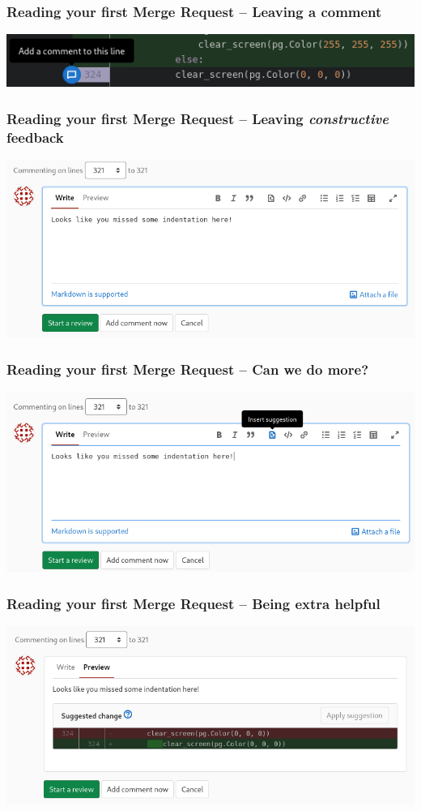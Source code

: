 \documentclass{beamer}
\begin{document}
\begin{frame}[fragile]
  \frametitle{Reading your first Merge Request -- Leaving a comment}
  \includegraphics[width=\linewidth]{gitlab-first-review/06-comment.png}
\end{frame}

\begin{frame}[fragile]
  \frametitle{Reading your first Merge Request -- Leaving \emph{constructive} feedback}
  \includegraphics[width=\linewidth]{gitlab-first-review/07-suggestion.png}
\end{frame}

\begin{frame}[fragile]
  \frametitle{Reading your first Merge Request -- Can we do more?}
  \includegraphics[width=\linewidth]{gitlab-first-review/08-sugg.png}
\end{frame}

\begin{frame}[fragile]
  \frametitle{Reading your first Merge Request -- Being extra helpful}
  \includegraphics[width=\linewidth]{gitlab-first-review/09-preview.png}
\end{frame}
\end{document}
